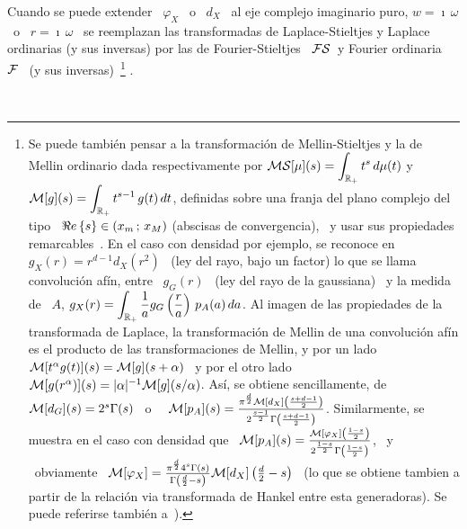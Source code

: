 Cuando se puede extender \ $\varphi_X$ \  o \ $d_X$ \ al eje complejo imaginario
puro, $w =  \imath \, \omega$ \ o \  $r = \imath \, \omega$  \ se reemplazan las
transformadas de Laplace-Stieltjes y Laplace ordinarias (y sus inversas) por las
de  Fourier-Stieltjes   \  $\mathcal{FS}$\   y  Fourier  ordinaria   \  $\mathcal{F}$  \   (y  sus
inversas)~\footnote{Se   puede  tambi\'en  pensar   a  la   transformaci\'on  de
  Mellin-Stieltjes   y  la   de  Mellin   ordinario  dada   respectivamente  por
  $\displaystyle  \mathcal{MS}[\mu](s) =  \int_{\mathbb{R}_+} t^s  \, d\mu(t)$  \quad  y \quad
  $\displaystyle  \mathcal{M}[g](s) = \int_{\mathbb{R}_+}  t^{s-1} \,  g(t) \,  dt$, definidas
  sobre una  franja del plano  complejo del tipo  \ $\Re e \left\{ s \right\} \in (x_m  \, ; \, x_M)$
  (abscisas de convergencia), \  y usar sus propiedades remarcables~\cite{Zol57,
    Pou99, Pou10,  Wid46, ParKam01}.   En el caso  con densidad por  ejemplo, se
  reconoce en \  $g_X(r) = r^{d-1} d_X\left( r^2 \right)$ \  (ley del rayo, bajo
  un factor) lo  que se llama convoluci\'on af\'in, entre \  $g_G(r)$ \ (ley del
  rayo  de la  gaussiana)  \  y la  medida  de \  $A$,  $\displaystyle g_X(r)  =
  \int_{\mathbb{R}_+} \frac{1}{a} g_G\left( \frac{r}{a} \right) \, p_A(a) \, da$.  Al
  imagen de las  propiedades de la transformada de  Laplace, la transformaci\'on
  de Mellin de  una convoluci\'on af\'in es el  producto de las transformaciones
  de Mellin, y por un lado \ $\mathcal{M}[t^\alpha g(t)](s) = \mathcal{M}[g](s+\alpha)$ \ y por el
  otro lado  \ $\mathcal{M}[g(r^\alpha)](s) = |\alpha|^{-1}  \mathcal{M}[g](s/\alpha)$.  As\'i, se
  obtiene  sencillamente,  de  \  $\mathcal{M}[d_G](s)  =  2^s  \Gamma(s)$~\cite[Cap.~12,
  Tabla~12.1]{Pou10}   o~\cite[Cap.~18,  Tabla~18.1]{Pou99}   \   $\mathcal{M}[p_A](s)  =
  \frac{\pi^{\frac{d}{2}}              \mathcal{M}[d_X]\left(             \frac{s+d-1}{2}
    \right)}{2^{\frac{s-1}{2}} \Gamma\left( \frac{s+d-1}{2} \right)}$.
  Similarmente,  se  muestra  en  el  caso  con densidad  que  \  $\mathcal{M}[p_A](s)  =
  \frac{\mathcal{M}[\varphi_X]\left(       \frac{1-s}{2}       \right)}{2^{\frac{1-s}{2}}
    \Gamma\left( \frac{1-s}{2} \right)}$,
  \   y   \   obviamente   \  $\mathcal{M}[\varphi_X]   =   \frac{\pi^{\frac{d}{2}}   4^s
    \Gamma(s)}{\Gamma\left( \frac{d}{2} - s \right)} \mathcal{M}[d_X]\left( \frac{d}{2} -
    s  \right)$ \  (lo que  se obtiene  tambien a  partir de  la  relaci\'on via
  transformada de  Hankel entre esta generadoras). Se  puede referirse tambi\'en
  a~\cite[\S~3.2.1]{Zoz12}).  }
%
\cite{Zol57, Pou99, Pou10, Wid46, ParKam01}.

\

